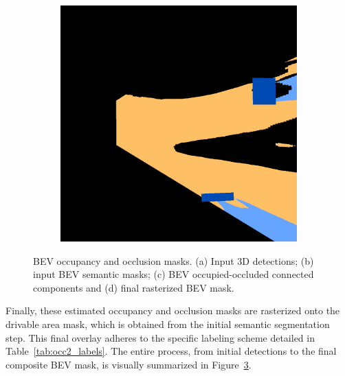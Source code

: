 \begin{figure}[h!]
\begin{subfigure}[b]{0.22\textwidth}
        \caption{}
        \label{fig:bev_occupancy_occlusion_c}
    \end{subfigure}
    \hfill
    \begin{subfigure}[b]{0.22\textwidth}
        \includegraphics[width=\textwidth]{images/methodology/bev_occupancy_oclusion/dt_occ_mask_colored_9.png}
        \caption{}
        \label{fig:bev_occupancy_occlusion_d}
    \end{subfigure}

    \caption{BEV occupancy and occlusion masks. (a) Input 3D detections; (b) input BEV semantic masks; (c) BEV occupied-occluded connected components and (d) final rasterized BEV mask.}
    \label{fig:bev_occupancy_occlusion}
\end{figure}


Finally, these estimated occupancy and occlusion masks are rasterized onto the  drivable area mask, which is obtained from the initial semantic segmentation step. This final overlay adheres to the specific labeling scheme detailed in Table~\ref{tab:occ2_labels}. The entire process, from initial detections to the final composite BEV mask, is visually summarized in Figure~\ref{fig:bev_occupancy_occlusion}.

